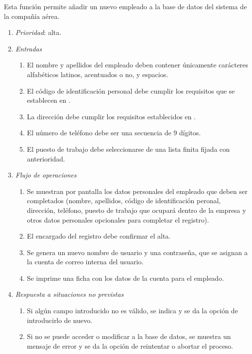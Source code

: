 

 \label{fun:registrarempleado}
	Esta función permite añadir un nuevo empleado a la base de datos del sistema de la compañía aérea.

	\begin{enumerate}
		\item \textit{Prioridad}: alta.
		\item \textit{Entradas}
		\begin{enumerate}
			\item El nombre y apellidos del empleado deben contener únicamente carácteres alfabéticos latinos, acentuados o no, y espacios.
			\item El código de identificación personal debe cumplir los requisitos que se establecen en .
			\item La dirección debe cumplir los requisitos establecidos en .
			\item El número de teléfono debe ser una secuencia de 9 dígitos.
			\item El puesto de trabajo debe seleccionarse de una lista finita fijada con anterioridad.
		\end{enumerate}
		\item \textit{Flujo de operaciones}
		\begin{enumerate}
			\item Se muestran por pantalla los datos personales del empleado que deben ser completados (nombre, apellidos, código de identificación peronal, dirección, teléfono, puesto de trabajo que ocupará dentro de la empresa y otros datos personales opcionales para completar el registro).
			\item El encargado del registro debe confirmar el alta.
			\item Se genera un nuevo nombre de usuario y una contraseña, que se asignan a la cuenta de correo interna del usuario.
			\item Se imprime una ficha con los datos de la cuenta para el empleado.
		\end{enumerate}
		\item \textit{Respuesta a situaciones no previstas}
		\begin{enumerate}
			\item Si algún campo introducido no es válido, se indica y se da la opción de introducirlo de nuevo.
			\item Si no se puede acceder o modificar a la base de datos, se muestra un mensaje de error y se da la opción de reintentar o abortar el proceso.
		\end{enumerate}

	\end{enumerate}
